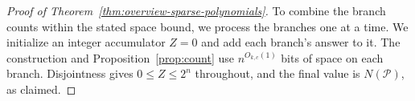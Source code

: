 \begin{proof}[Proof of Theorem~\ref{thm:overview-sparse-polynomials}]
To combine the branch counts within the stated space bound, we
process the branches one at a time. We initialize an integer
accumulator $Z=0$ and add each branch's answer to it. The construction and
Proposition~\ref{prop:count} use $n^{O_{k,c}(1)}$ bits of space on
each branch.
Disjointness gives $0\le Z\le2^n$ throughout, and the final value
is $N(\mathcal P)$, as claimed.
\end{proof}

